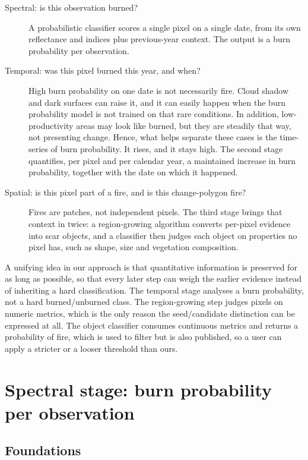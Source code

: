 \documentclass[11pt,a4paper]{article}
\begin{document}
\FloatBarrier

\begin{description}
  \item[Spectral: is this observation burned?] A probabilistic classifier scores a single
    pixel on a single date, from its own reflectance and indices plus previous-year context. The
    output is a burn probability per observation.
  \item[Temporal: was this pixel burned this year, and when?] High burn probability on one date is
    not necessarily fire. Cloud shadow and dark surfaces can raise it, and it can easily happen 
    when the burn probability model is not trained on that rare conditions. 
    In addition, low-productivity areas may look like burned, but they are steadily that way, not
    presenting change. Hence, what helps separate
    these cases is the time-series of burn probability. It rises, and it stays high. The second stage
    quantifies, per pixel and per calendar year, a maintained increase in burn probability,
    together with the date on which it happened.
  \item[Spatial: is this pixel part of a fire, and is this change-polygon fire?] Fires are patches, 
    not independent pixels. The
    third stage brings that context in twice: a region-growing algorithm converts per-pixel
    evidence into scar objects, and a classifier then judges each object on properties no pixel
    has, such as shape, size and vegetation composition.
\end{description}

A unifying idea in our approach is that quantitative information is preserved for as long as
possible, so that every later step can weigh the earlier evidence instead of inheriting a hard
classification. The temporal stage analyses a burn probability, not a hard burned/unburned class.
The region-growing step judges pixels on numeric metrics, which is the only reason the
seed/candidate distinction can be expressed at all. The object classifier consumes continuous
metrics and returns a probability of fire, which is used to filter but is also published, so a
user can apply a stricter or a looser threshold than ours.

\section{Spectral stage: burn probability per observation}\label{sec-spectral}

\subsection{Foundations}
\end{document}

